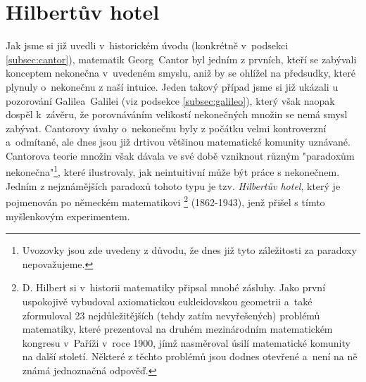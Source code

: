 \section{Hilbertův hotel}\label{sec:hilbertuv_hotel}
Jak jsme si již uvedli v~historickém úvodu (konkrétně v~podsekci \ref{subsec:cantor}), matematik Georg~Cantor byl jedním z prvních, kteří se zabývali konceptem nekonečna v~uvedeném smyslu, aniž by se ohlížel na předsudky, které plynuly o~nekonečnu z naší intuice. Jeden takový případ jsme si již ukázali u pozorování Galilea~Galilei (viz podsekce \ref{subsec:galileo}), který však naopak dospěl k~závěru, že porovnáváním velikostí nekonečných množin se nemá smysl zabývat. Cantorovy úvahy o~nekonečnu byly z počátku velmi kontroverzní a~odmítané, ale dnes jsou již drtivou většinou matematické komunity uznávané. Cantorova teorie množin však dávala ve své době vzniknout různým "paradoxům nekonečna"\footnote{Uvozovky jsou zde uvedeny z důvodu, že dnes již tyto záležitosti za paradoxy nepovažujeme.}, které ilustrovaly, jak neintuitivní může být práce s nekonečnem. Jedním z nejznámějších paradoxů tohoto typu je tzv. \emph{Hilbertův hotel}, který je pojmenován po německém matematikovi \footnote{D. Hilbert si v~historii matematiky připsal mnohé zásluhy. Jako první uspokojivě vybudoval axiomatickou eukleidovskou geometrii a~také zformuloval 23 nejdůležitějších (tehdy zatím nevyřešených) problémů matematiky, které prezentoval na druhém mezinárodním matematickém kongresu v~Paříži v~roce 1900, jímž nasměroval úsilí matematické komunity na další století. Některé z těchto problémů jsou dodnes otevřené a~není na ně známá jednoznačná odpověď.} \mbox{(1862-1943)}, jenž přišel s tímto myšlenkovým experimentem.
\medskip

